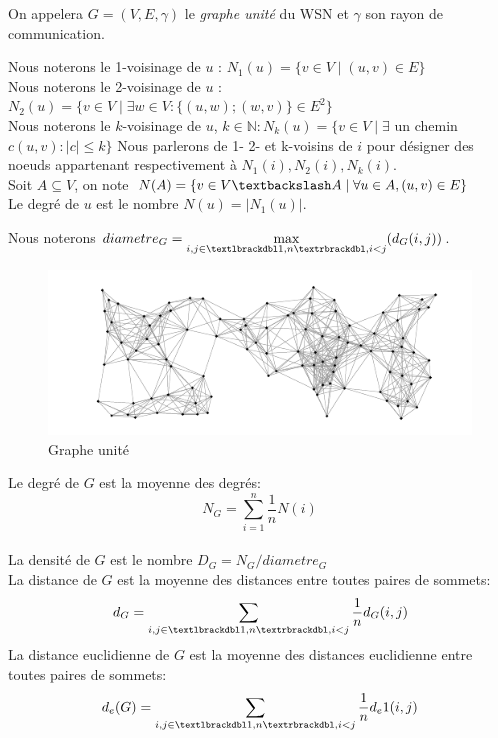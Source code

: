 \begin{mydef}
 On appelera $G= (V,E,\gamma)$ le \textit{graphe unité} du WSN et $\gamma$ son rayon de communication.
\end{mydef}



\begin{mydef}
Nous noterons le 1-voisinage de $u$ : $N_1(u) = \{ v \in V  \mid (u,v) \in E \}$ \\
Nous noterons le 2-voisinage de $u$ : $N_2(u) = \{ v \in V \mid  \exists w \in V :\{(u,w);(w,v)\} \in E ^2\}$ \\
Nous noterons le $k$-voisinage de $u$, $k \in \mathbb{N} : N_k(u) = \{ v \in V  \mid \exists $ un chemin $c (u,v): |c| \leq k\}$  Nous parlerons de 1- 2- et k-voisins de $i$ pour désigner des noeuds appartenant respectivement
 à $N_1(i), N_2(i),N_k(i)$. \\
Soit $A \subseteq V$, on note $N(A) = \{ v \in V\textbackslash  A \mid \forall u\in A,(u,v) \in E \}$ \\
Le degré de $ u $ est le nombre  $N(u)=|N_1(u)|$.\\
\end{mydef}

\begin{mydef}
Nous noterons $diametre_G= \max\limits_{i,j\in \textlbrackdbl 1,n \textrbrackdbl,i<j} (d_G(i,j))$.
\end{mydef}
 

\begin{figure}[H]
\centering
\includegraphics[scale=0.5]{Etat_de_l'art/source/graph1.png}
\caption{Graphe unité}
\end{figure} 



\begin{mydef}
 
 Le degré de $G$ est la moyenne des degrés:$$N_G=\sum_{i=1}^n{\frac1n N(i)}$$\\
 La densité de $G$ est le nombre $D_G=N_G/diametre_G$\\
 La distance de $G$ est la moyenne des distances entre toutes paires de sommets:$$d_G=\sum_{i,j\in \textlbrackdbl 1,n \textrbrackdbl,i<j}{\frac1n d_G(i,j)}$$
 La distance euclidienne de $G$ est la moyenne des distances euclidienne entre toutes paires de sommets:$$d_e(G)=\sum_{i,j\in \textlbrackdbl 1,n \textrbrackdbl,i<j}{\frac1n d_e1(i,j)}$$

\end{mydef}


